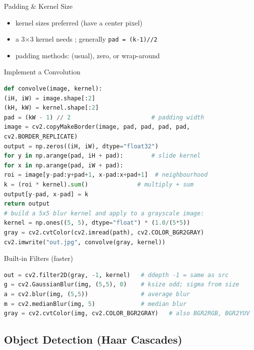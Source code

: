 \begin{definition}{Padding \& Kernel Size}
    \begin{itemize}
        \item {} kernel sizes preferred (have a center pixel)
        \item a 3$\times$3 kernel needs ; generally
              \texttt{pad = (k-1)//2}
        \item padding methods:  (usual), zero, or wrap-around
    \end{itemize}
\end{definition}

\multend

\begin{KR}{Implement a Convolution}
\begin{lstlisting}[language=Python, style=basesmol, aboveskip=2pt, belowskip=2pt]
def convolve(image, kernel):
(iH, iW) = image.shape[:2]
(kH, kW) = kernel.shape[:2]
pad = (kW - 1) // 2                       # padding width
image = cv2.copyMakeBorder(image, pad, pad, pad, pad,
cv2.BORDER_REPLICATE)
output = np.zeros((iH, iW), dtype="float32")
for y in np.arange(pad, iH + pad):        # slide kernel
for x in np.arange(pad, iW + pad):
roi = image[y-pad:y+pad+1, x-pad:x+pad+1]  # neighbourhood
k = (roi * kernel).sum()              # multiply + sum
output[y-pad, x-pad] = k
return output
# build a 5x5 blur kernel and apply to a grayscale image:
kernel = np.ones((5, 5), dtype="float") * (1.0/(5*5))
gray = cv2.cvtColor(cv2.imread(path), cv2.COLOR_BGR2GRAY)
cv2.imwrite("out.jpg", convolve(gray, kernel))
\end{lstlisting}
\end{KR}

\begin{KR}{Built-in Filters (faster)}
\begin{lstlisting}[language=Python, style=basesmol, aboveskip=2pt, belowskip=2pt]
out = cv2.filter2D(gray, -1, kernel)   # ddepth -1 = same as src
g = cv2.GaussianBlur(img, (5,5), 0)    # ksize odd; sigma from size
a = cv2.blur(img, (5,5))               # average blur
m = cv2.medianBlur(img, 5)             # median blur
gray = cv2.cvtColor(img, cv2.COLOR_BGR2GRAY)   # also BGR2RGB, BGR2YUV
\end{lstlisting}
\end{KR}

\raggedcolumns
    \columnbreak

\subsection{Object Detection (Haar Cascades)}

